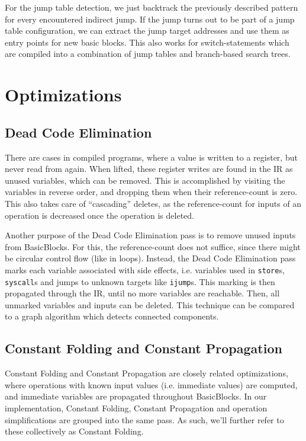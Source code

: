 \documentclass[course=eragp]{aspdoc}
\begin{document}
\par

For the jump table detection, we just backtrack the previously described pattern for every
encountered indirect jump. If the jump turns out to be part of a jump table configuration, we can
extract the jump target addresses and use them as entry points for new basic blocks. This also works
for switch-statements which are compiled into a combination of jump tables and branch-based search
trees.

\section{Optimizations}
\subsection{Dead Code Elimination}\label{dead_code_elimination}

There are cases in compiled programs, where a value is written to a register, but never read from again.
When lifted, these register writes are found in the IR as unused variables, which can be removed.
This is accomplished by visiting the variables in reverse order, and dropping them when their reference-count is zero.
This also takes care of ``cascading'' deletes, as the reference-count for inputs of an operation is decreased once the
operation is deleted.

Another purpose of the Dead Code Elimination pass is to remove unused inputs from BasicBlocks. For this, the
reference-count does not suffice, since there might be circular control flow (like in loops). Instead, the Dead Code
Elimination pass marks each variable associated with side effects, i.e. variables used in \texttt{store}s,
\texttt{syscall}s and jumps to unknown targets like \texttt{ijump}s. This marking is then propagated through the IR,
until no more variables are reachable. Then, all unmarked variables and inputs can be deleted. This
technique can be compared to a graph algorithm which detects connected components.

\subsection{Constant Folding and Constant Propagation}\label{constant_folding}

Constant Folding and Constant Propagation are closely related optimizations, where operations with known input values
(i.e. immediate values) are computed, and immediate variables are propagated throughout BasicBlocks.
In our implementation, Constant Folding, Constant Propagation and operation simplifications are grouped into the same
pass.  As such, we'll further refer to these collectively as Constant Folding.
\end{document}
